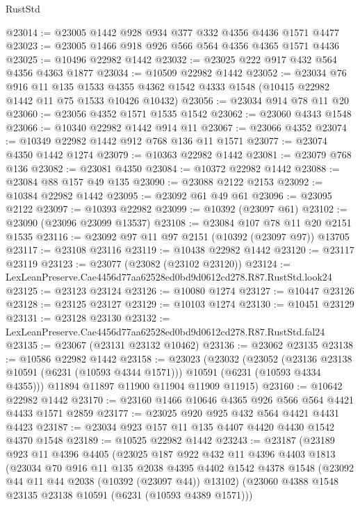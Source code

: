 \begin{lexlean}{RustStd}
\begin{coremodule}
{{@23014 := @23005 @1442 @928 @934 @377 @332 @4356 @4436 @1571 @4477
@23023 := @23005 @1466 @918 @926 @566 @564 @4356 @4365 @1571 @4436
@23025 := @10496 @22982 @1442
@23032 := @23025 @222 @917 @432 @564 @4356 @4363 @1877
@23034 := @10509 @22982 @1442
@23052 := @23034
    @76
    @916
    @11
    @135
    @1533
    @4355
    @4362
    @1542
    @4333
    @1548
    (@10415 @22982 @1442 @11 @75 @1533 @10426 @10432)
@23056 := @23034 @914 @78 @11 @20
@23060 := @23056 @4352 @1571 @1535 @1542
@23062 := @23060 @4343 @1548
@23066 := @10340 @22982 @1442 @914 @11
@23067 := @23066 @4352
@23074 := @10349 @22982 @1442 @912 @768 @136 @11 @1571
@23077 := @23074 @4350 @1442 @1274
@23079 := @10363 @22982 @1442
@23081 := @23079 @768 @136
@23082 := @23081 @4350
@23084 := @10372 @22982 @1442
@23088 := @23084 @88 @157 @49 @135
@23090 := @23088 @2122 @2153
@23092 := @10384 @22982 @1442
@23095 := @23092 @61 @49 @61
@23096 := @23095 @2122
@23097 := @10393 @22982
@23099 := @10392 (@23097 @61)
@23102 := @23090 (@23096 @23099 @13537)
@23108 := @23084 @107 @78 @11 @20 @2151 @1535
@23116 := @23092 @97 @11 @97 @2151 (@10392 (@23097 @97)) @13705
@23117 := @23108 @23116
@23119 := @10438 @22982 @1442
@23120 := @23117 @23119
@23123 := @23077 (@23082 (@23102 @23120))
@23124 := LexLeanPreserve.Cae4456d77aa62528ed0bd9d0612cd278.R87.RustStd.look24
@23125 := @23123 @23124
@23126 := @10080 @1274
@23127 := @10447 @23126
@23128 := @23125 @23127
@23129 := @10103 @1274
@23130 := @10451 @23129
@23131 := @23128 @23130
@23132 := LexLeanPreserve.Cae4456d77aa62528ed0bd9d0612cd278.R87.RustStd.fal24
@23135 := @23067 (@23131 @23132 @10462)
@23136 := @23062 @23135
@23138 := @10586 @22982 @1442
@23158 := @23023
    (@23032
      (@23052
        (@23136 @23138 @10591 (@6231 (@10593 @4344 @1571)))
        @10591
        (@6231 (@10593 @4334 @4355)))
      @11894
      @11897
      @11900
      @11904
      @11909
      @11915)
@23160 := @10642 @22982 @1442
@23170 := @23160 @1466 @10646 @4365 @926 @566 @564 @4421 @4433 @1571 @2859
@23177 := @23025 @920 @925 @432 @564 @4421 @4431 @4423
@23187 := @23034 @923 @157 @11 @135 @4407 @4420 @4430 @1542 @4370 @1548
@23189 := @10525 @22982 @1442
@23243 := @23187
    (@23189
      @923
      @11
      @4396
      @4405
      (@23025
        @187
        @922
        @432
        @11
        @4396
        @4403
        @1813
        (@23034
          @70
          @916
          @11
          @135
          @2038
          @4395
          @4402
          @1542
          @4378
          @1548
          (@23092 @44 @11 @44 @2038 (@10392 (@23097 @44)) @13102)
          (@23060 @4388 @1548 @23135 @23138 @10591 (@6231 (@10593 @4389 @1571)))
}}
\end{coremodule}
\end{lexlean}
